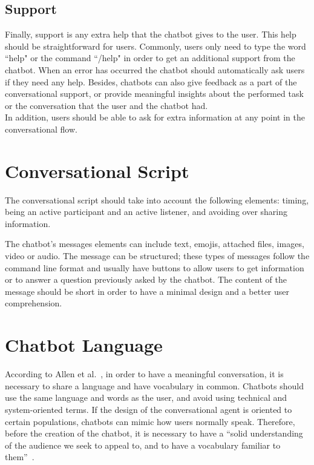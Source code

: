 \documentclass[a4paper,10pt]{article}
\begin{document}
\subsection{Support}
Finally, support is any extra help that the chatbot gives to the user. This help should be straightforward for users. Commonly, users only need to type the word ``help" or the command ``/help" in order to get an additional support from the chatbot. When an error has occurred the chatbot should automatically ask users if they need any help. Besides, chatbots can also give feedback as a part of the conversational support, or provide meaningful insights about the performed task or the conversation that the user and the chatbot had.\\[0\baselineskip] In addition, users should be able to ask for extra information at any point in the conversational flow.

\section{Conversational Script}
The conversational script should take into account the following elements: timing, being an active participant and an active listener, and avoiding over sharing information.

The chatbot's messages elements can include text, emojis, attached files, images, video or audio. The message can be structured; these types of messages follow the command line format and usually have buttons to allow users to get information or to answer a question previously asked by the chatbot. The content of the message should be short in order to have a minimal design and a better user comprehension.  %

\section{Chatbot Language}
According to Allen et al.~\cite{allen1978conversation}, in order to have a meaningful conversation, it is necessary to share a language and have vocabulary in common. Chatbots should use the same language and words as the user, and avoid using technical and system-oriented terms. If the design of the conversational agent is oriented to certain populations, chatbots can mimic how users normally speak.  Therefore, before the creation of the chatbot, it is necessary to have a ``solid understanding of the audience we seek to appeal to, and to have a vocabulary familiar to them”~\cite{HeuristicsWebPage}. 
\end{document}

